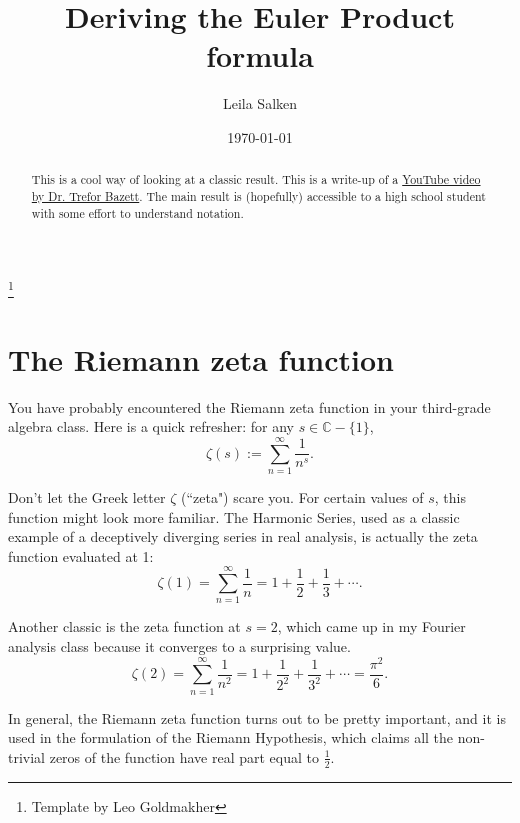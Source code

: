 \documentclass[12pt,reqno]{amsart}
\theoremstyle{plain} %
\theoremstyle{remark}
\theoremstyle{definition}
\newcommand{\C}{\mathbb C}
\begin{document}





\title{Deriving the Euler Product formula}
\author{Leila Salken}
\thanks{Template by Leo Goldmakher}
\date{\today}

\begin{abstract}
This is a cool way of looking at a classic result. This is a write-up of a \href{https://youtu.be/u7BadbVwnl4?si=L015k4uCUR-tFq8i}{YouTube video by Dr. Trefor Bazett}. The main result is (hopefully) accessible to a high school student with some effort to understand notation. 
\end{abstract}

\maketitle
\thispagestyle{empty}


\section{The Riemann zeta function} \label{sect:0}

You have probably encountered the Riemann zeta function in your third-grade algebra class. Here is a quick refresher: for any $s \in \C - \{1\}$, 
\[
\zeta(s) := \sum_{n=1}^\infty \frac{1}{n^s}.
\]

Don't let the Greek letter $\zeta$ (``zeta") scare you. For certain values of $s$, this function might look more familiar. The Harmonic Series, used as a classic example of a deceptively diverging series in real analysis, is actually the zeta function evaluated at 1:
\[
\zeta(1) = \sum_{n=1}^\infty \frac{1}{n} = 1+ \frac{1}{2} + \frac{1}{3} + \cdots .
\]

Another classic is the zeta function at $s=2$, which came up in my Fourier analysis class because it converges to a surprising value. 
\[
\zeta(2) = \sum_{n=1}^\infty \frac{1}{n^2} = 1+ \frac{1}{2^2} + \frac{1}{3^2} + \cdots  = \frac{\pi^2}{6}.
\]

In general, the Riemann zeta function turns out to be pretty important, and it is used in the formulation of the Riemann Hypothesis, which claims all the non-trivial zeros of the function have real part equal to $\frac{1}{2}$. 
\end{document}
